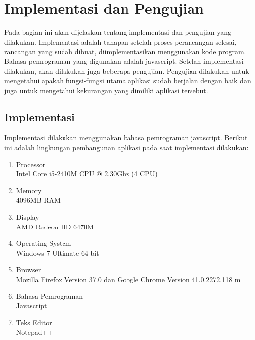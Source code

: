 \chapter{Implementasi dan Pengujian}
Pada bagian ini akan dijelaskan tentang implementasi dan pengujian yang
dilakukan. Implementasi adalah tahapan setelah proses perancangan selesai,
rancangan yang sudah dibuat, diimplementasikan menggunakan kode program. Bahasa
pemrograman yang digunakan adalah javascript. Setelah implementasi dilakukan,
akan dilakukan juga beberapa pengujian. Pengujian dilakukan untuk mengetahui
apakah fungsi-fungsi utama aplikasi sudah berjalan dengan baik dan
juga untuk mengetahui kekurangan yang dimiliki aplikasi tersebut.

\section{Implementasi}
Implementasi dilakukan menggunakan bahasa pemrograman javascript. Berikut ini
adalah lingkungan pembangunan aplikasi pada saat implementasi dilakukan:
\begin{enumerate}
  \item Processor\\
  Intel Core i5-2410M CPU @ 2.30Ghz (4 CPU)
  
  \item Memory\\
  4096MB RAM
  
  \item Display\\
  AMD Radeon HD 6470M
  
  \item Operating System\\
  Windows 7 Ultimate 64-bit
  
  \item Browser\\
  Mozilla Firefox Version 37.0 dan Google Chrome Version 41.0.2272.118 m 
  
  \item Bahasa Pemrograman\\
  Javascript
  
  \item Teks Editor\\
  Notepad++
\end{enumerate}